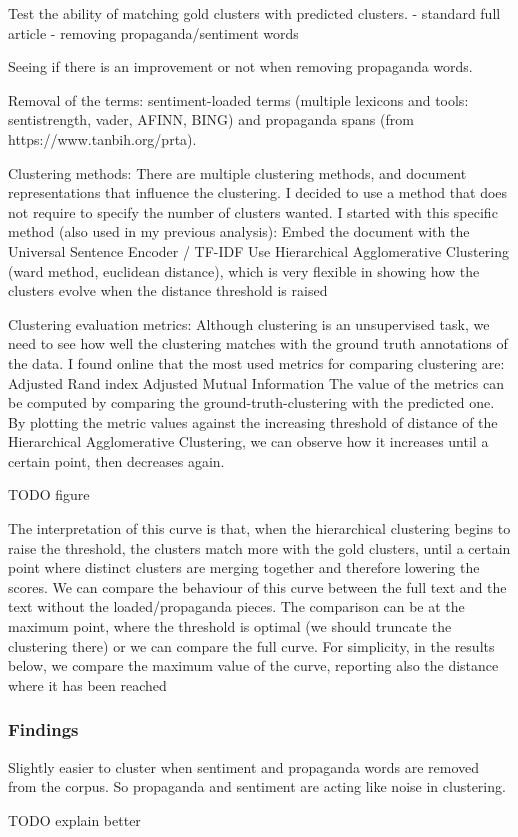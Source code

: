 Test the ability of matching gold clusters with predicted clusters.
- standard full article
- removing propaganda/sentiment words

Seeing if there is an improvement or not when removing propaganda words.

Removal of the terms: sentiment-loaded terms (multiple lexicons and tools: sentistrength, vader, AFINN, BING) and propaganda spans (from https://www.tanbih.org/prta).

Clustering methods:
There are multiple clustering methods, and document representations that influence the clustering. I decided to use a method that does not require to specify the number of clusters wanted.
I started with this specific method (also used in my previous analysis):
Embed the document with the Universal Sentence Encoder / TF-IDF
Use Hierarchical Agglomerative Clustering (ward method, euclidean distance), which  is very flexible in showing how the clusters evolve when the distance threshold is raised


Clustering evaluation metrics:
Although clustering is an unsupervised task, we need to see how well the clustering matches with the ground truth annotations of the data. I found online that the most used metrics for comparing clustering are:
Adjusted Rand index
Adjusted Mutual Information
The value of the metrics can be computed by comparing the ground-truth-clustering with the predicted one.
By plotting the metric values against the increasing threshold of distance of the Hierarchical Agglomerative Clustering, we can observe how it increases until a certain point, then decreases again.

TODO figure

The interpretation of this curve is that, when the hierarchical clustering begins to raise the threshold, the clusters match more with the gold clusters, until a certain point where distinct clusters are merging together and therefore lowering the scores.
We can compare the behaviour of this curve between the full text and the text without the loaded/propaganda pieces. The comparison can be at the maximum point, where the threshold is optimal (we should truncate the clustering there) or we can compare the full curve. For simplicity, in the results below, we compare the maximum value of the curve, reporting also the distance where it has been reached


\subsubsection{Findings}

Slightly easier to cluster when sentiment and propaganda words are removed from the corpus.
So propaganda and sentiment are acting like noise in clustering.

TODO explain better

